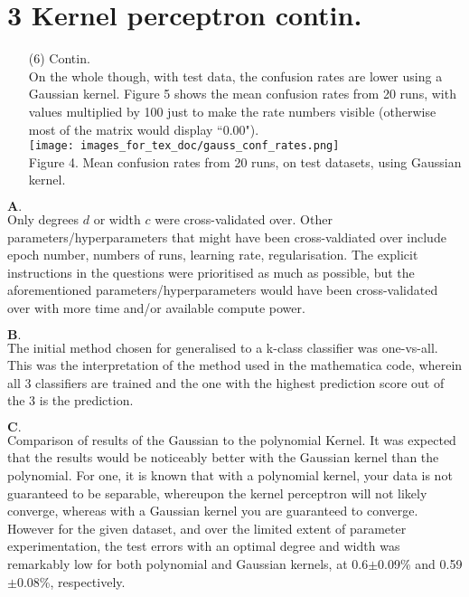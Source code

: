 \documentclass[a4paper,12pt]{article}
\begin{document}
\section*{3 Kernel perceptron contin.}

\begin{enumerate}
\item[(6)] Contin.\\
On the whole though, with test data, the confusion rates are lower using a Gaussian kernel. Figure 5 shows the mean confusion rates from 20 runs, with values multiplied by 100 just to make the rate numbers visible (otherwise most of the matrix would display ``0.00"). \\
\texttt{[image: images\_for\_tex\_doc/gauss\_conf\_rates.png]}\\
Figure 4. Mean confusion rates from 20 runs, on test datasets, using Gaussian kernel.


\end{enumerate}
$\textbf{A.}$\\
Only degrees $d$ or width $c$ were cross-validated over. Other parameters/hyperparameters that might have been cross-valdiated over include epoch number, numbers of runs, learning rate, regularisation. The explicit instructions in the questions were prioritised as much as possible, but the aforementioned parameters/hyperparameters would have been cross-validated over with more time and/or available compute power.

$\textbf{B.}$\\
The initial method chosen for generalised to a k-class classifier was one-vs-all. This was the interpretation of the method used in the mathematica code, wherein all 3 classifiers are trained and the one with the highest prediction score out of the 3 is the prediction.

$\textbf{C.}$\\ 
Comparison of results of the Gaussian to the polynomial Kernel. It was expected that the results would be noticeably better with the Gaussian kernel than the polynomial. For one, it is known that with a polynomial kernel, your data is not guaranteed to be separable, whereupon the kernel perceptron will not likely converge, whereas with a Gaussian kernel you are guaranteed to converge. However for the given dataset, and over the limited extent of parameter experimentation, the test errors with an optimal degree and width was remarkably low for both polynomial and Gaussian kernels, at 0.6$\pm$0.09\% and 0.59$\pm$0.08\%, respectively.
\end{document}
